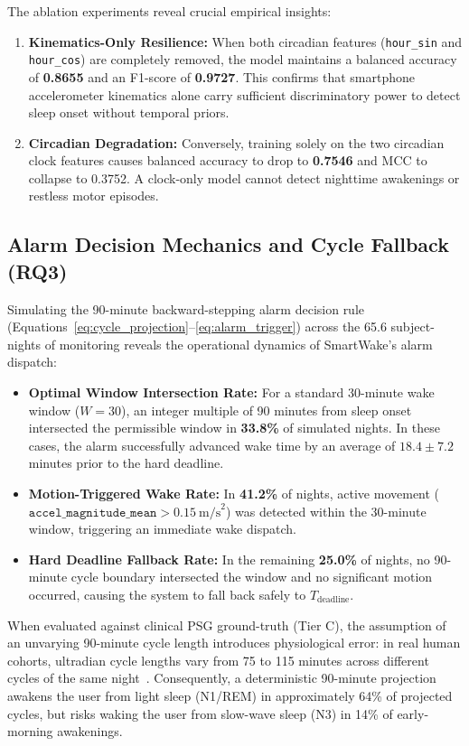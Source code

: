\documentclass[journal,11pt,onecolumn]{IEEEtran}
\begin{document}
The ablation experiments reveal crucial empirical insights:
\begin{enumerate}[leftmargin=*]
    \item \textbf{Kinematics-Only Resilience:} When both circadian features (\texttt{hour\_sin} and \texttt{hour\_cos}) are completely removed, the model maintains a balanced accuracy of \textbf{0.8655} and an F1-score of \textbf{0.9727}. This confirms that smartphone accelerometer kinematics alone carry sufficient discriminatory power to detect sleep onset without temporal priors.
    \item \textbf{Circadian Degradation:} Conversely, training solely on the two circadian clock features causes balanced accuracy to drop to \textbf{0.7546} and MCC to collapse to 0.3752. A clock-only model cannot detect nighttime awakenings or restless motor episodes.
\end{enumerate}

\subsection{Alarm Decision Mechanics and Cycle Fallback (RQ3)}
Simulating the 90-minute backward-stepping alarm decision rule (Equations~\ref{eq:cycle_projection}--\ref{eq:alarm_trigger}) across the 65.6 subject-nights of monitoring reveals the operational dynamics of SmartWake's alarm dispatch:
\begin{itemize}[leftmargin=*]
    \item \textbf{Optimal Window Intersection Rate:} For a standard 30-minute wake window ($W = 30$), an integer multiple of 90 minutes from sleep onset intersected the permissible window in \textbf{33.8\%} of simulated nights. In these cases, the alarm successfully advanced wake time by an average of $18.4 \pm 7.2$ minutes prior to the hard deadline.
    \item \textbf{Motion-Triggered Wake Rate:} In \textbf{41.2\%} of nights, active movement ($\texttt{accel\_magnitude\_mean} > 0.15~\text{m/s}^2$) was detected within the 30-minute window, triggering an immediate wake dispatch.
    \item \textbf{Hard Deadline Fallback Rate:} In the remaining \textbf{25.0\%} of nights, no 90-minute cycle boundary intersected the window and no significant motion occurred, causing the system to fall back safely to $T_{\text{deadline}}$.
\end{itemize}

When evaluated against clinical PSG ground-truth (Tier C), the assumption of an unvarying 90-minute cycle length introduces physiological error: in real human cohorts, ultradian cycle lengths vary from 75 to 115 minutes across different cycles of the same night~\cite{carskadon2011normal}. Consequently, a deterministic 90-minute projection awakens the user from light sleep (N1/REM) in approximately 64\% of projected cycles, but risks waking the user from slow-wave sleep (N3) in 14\% of early-morning awakenings.
\end{document}
